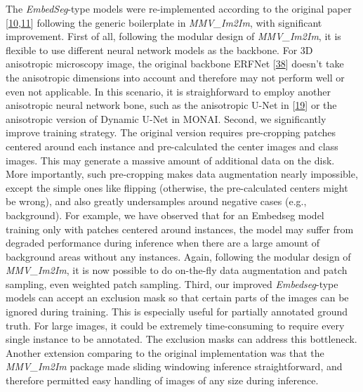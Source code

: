 The \emph{EmbedSeg}-type models were re-implemented according to the original paper {[}\protect\hyperlink{ref-K2ugNcVa}{10},\protect\hyperlink{ref-QmYuUQ5K}{11}{]} following the generic boilerplate in \emph{MMV\_Im2Im}, with significant improvement. First of all, following the modular design of \emph{MMV\_Im2Im}, it is flexible to use different neural network models as the backbone. For 3D anisotropic microscopy image, the original backbone ERFNet {[}\protect\hyperlink{ref-XAkgs3Nh}{38}{]} doesn't take the anisotropic dimensions into account and therefore may not perform well or even not applicable. In this scenario, it is straighforward to employ another anisotropic neural network bone, such as the anisotropic U-Net in {[}\protect\hyperlink{ref-jM3v1UjQ}{19}{]} or the anisotropic version of Dynamic U-Net in MONAI. Second, we significantly improve training strategy. The original version requires pre-cropping patches centered around each instance and pre-calculated the center images and class images. This may generate a massive amount of additional data on the disk. More importantly, such pre-cropping makes data augmentation nearly impossible, except the simple ones like flipping (otherwise, the pre-calculated centers might be wrong), and also greatly undersamples around negative cases (e.g., background). For example, we have observed that for an Embedseg model training only with patches centered around instances, the model may suffer from degraded performance during inference when there are a large amount of background areas without any instances. Again, following the modular design of \emph{MMV\_Im2Im}, it is now possible to do on-the-fly data augmentation and patch sampling, even weighted patch sampling. Third, our improved \emph{Embedseg}-type models can accept an exclusion mask so that certain parts of the images can be ignored during training. This is especially useful for partially annotated ground truth. For large images, it could be extremely time-consuming to require every single instance to be annotated. The exclusion masks can address this bottleneck. Another extension comparing to the original implementation was that the \emph{MMV\_Im2Im} package made sliding windowing inference straightforward, and therefore permitted easy handling of images of any size during inference.

